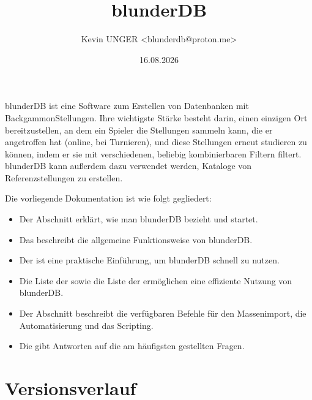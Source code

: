 \documentclass[letterpaper,10pt,german]{sphinxmanual}
\title{blunderDB}
\date{16.08.2026}
\author{Kevin UNGER <blunderdb@proton.me>}
\begin{document}
\pagestyle{empty}
\sphinxmaketitle
\pagestyle{plain}
\sphinxtableofcontents
\pagestyle{normal}
\label{\detokenize{index::doc}}


\sphinxAtStartPar
blunderDB ist eine Software zum Erstellen von Datenbanken mit Backgammon\sphinxhyphen{}Stellungen. Ihre wichtigste Stärke besteht darin, einen einzigen Ort bereitzustellen, an dem ein Spieler die Stellungen sammeln kann, die er angetroffen hat (online, bei Turnieren), und diese Stellungen erneut studieren zu können, indem er sie mit verschiedenen, beliebig kombinierbaren Filtern filtert. blunderDB kann außerdem dazu verwendet werden, Kataloge von Referenzstellungen zu erstellen.

\sphinxAtStartPar
Die vorliegende Dokumentation ist wie folgt gegliedert:
\begin{itemize}
\item {} 
\sphinxAtStartPar
Der Abschnitt  erklärt, wie man blunderDB bezieht und startet.

\item {} 
\sphinxAtStartPar
Das  beschreibt die allgemeine Funktionsweise von blunderDB.

\item {} 
\sphinxAtStartPar
Der  ist eine praktische Einführung, um blunderDB schnell zu nutzen.

\item {} 
\sphinxAtStartPar
Die Liste der  sowie die Liste der  ermöglichen eine effiziente Nutzung von blunderDB.

\item {} 
\sphinxAtStartPar
Der Abschnitt  beschreibt die verfügbaren Befehle für den Massenimport, die Automatisierung und das Scripting.

\item {} 
\sphinxAtStartPar
Die  gibt Antworten auf die am häufigsten gestellten Fragen.

\end{itemize}


\chapter{Versionsverlauf}
\label{\detokenize{index:historique-des-versions}}
\end{document}
